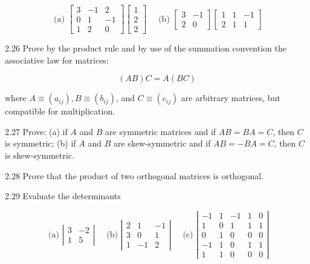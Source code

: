\documentclass[10pt]{article}
\begin{document}
$$
\text { (a) }\left[\begin{array}{rrr}
3 & -1 & 2 \\
0 & 1 & -1 \\
1 & 2 & 0
\end{array}\right]\left[\begin{array}{l}
1 \\
2 \\
2
\end{array}\right] \quad \text { (b) }\left[\begin{array}{rr}
3 & -1 \\
2 & 0
\end{array}\right]\left[\begin{array}{rrr}
1 & 1 & -1 \\
2 & 1 & 1
\end{array}\right]
$$

2.26 Prove by the product rule and by use of the summation convention the associative law for matrices:

$$
(A B) C=A(B C)
$$

where $A \equiv\left(a_{i j}\right), B \equiv\left(b_{i j}\right)$, and $C \equiv\left(c_{i j}\right)$ are arbitrary matrices, but compatible for multiplication.

2.27 Prove: (a) if $A$ and $B$ are symmetric matrices and if $A B=B A=C$, then $C$ is symmetric; (b) if $A$ and $B$ are skew-symmetric and if $A B=-B A=C$, then $C$ is skew-symmetric.

2.28 Prove that the product of two orthogonal matrices is orthogonal.

2.29 Evaluate the determinants

$$
\text { (a) }\left|\begin{array}{rr}
3 & -2 \\
1 & 5
\end{array}\right| \quad \text { (b) }\left|\begin{array}{rrr}
2 & 1 & -1 \\
3 & 0 & 1 \\
1 & -1 & 2
\end{array}\right| \quad \text { (c) }\left|\begin{array}{rrrrr}
-1 & 1 & -1 & 1 & 0 \\
1 & 0 & 1 & 1 & 1 \\
0 & 1 & 0 & 0 & 0 \\
-1 & 1 & 0 & 1 & 1 \\
1 & 1 & 0 & 0 & 0
\end{array}\right|
$$
\end{document}
